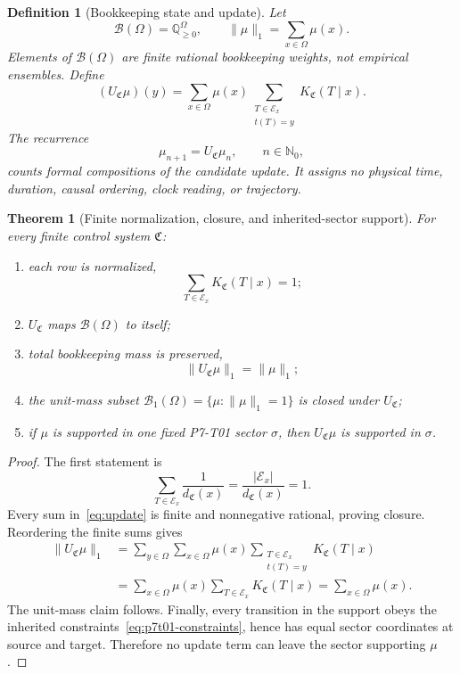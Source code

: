\documentclass[11pt]{article}
\newtheorem{definition}{Definition}
\newtheorem{theorem}{Theorem}
\newcommand{\Control}{\mathfrak C}
\newcommand{\Enabled}{\mathcal E}
\newcommand{\Book}{\mathcal B}
\newcommand{\Kernel}{K_{\Control}}
\newcommand{\Update}{U_{\Control}}
\begin{document}
\begin{definition}[Bookkeeping state and update]
Let
\[
  \Book(\Omega)=\mathbb Q_{\geq0}^{\Omega},
  \qquad
  \|\mu\|_1=\sum_{x\in\Omega}\mu(x).
\]
Elements of \(\Book(\Omega)\) are finite rational bookkeeping weights, not
empirical ensembles. Define
\begin{equation}
  (\Update\mu)(y)
  =
  \sum_{x\in\Omega}\mu(x)
  \sum_{\substack{T\in\Enabled_x\\t(T)=y}}
  \Kernel(T\mid x).
  \label{eq:update}
\end{equation}
The recurrence
\[
  \mu_{n+1}=\Update\mu_n,\qquad n\in\mathbb N_0,
\]
counts formal compositions of the candidate update. It assigns no physical
time, duration, causal ordering, clock reading, or trajectory.
\end{definition}

\begin{theorem}[Finite normalization, closure, and inherited-sector support]
\label{thm:normalization}
For every finite control system \(\Control\):
\begin{enumerate}[leftmargin=*]
\item each row is normalized,
  \[
    \sum_{T\in\Enabled_x}\Kernel(T\mid x)=1;
  \]
\item \(\Update\) maps \(\Book(\Omega)\) to itself;
\item total bookkeeping mass is preserved,
  \[
    \|\Update\mu\|_1=\|\mu\|_1;
  \]
\item the unit-mass subset
  \(\Book_1(\Omega)=\{\mu:\|\mu\|_1=1\}\) is closed under
  \(\Update\);
\item if \(\mu\) is supported in one fixed P7-T01 sector \(\sigma\), then
  \(\Update\mu\) is supported in \(\sigma\).
\end{enumerate}
\end{theorem}

\begin{proof}
The first statement is
\[
  \sum_{T\in\Enabled_x}\frac{1}{d_{\Control}(x)}
  =
  \frac{|\Enabled_x|}{d_{\Control}(x)}=1.
\]
Every sum in~\eqref{eq:update} is finite and nonnegative rational, proving
closure. Reordering the finite sums gives
\[
\begin{aligned}
  \|\Update\mu\|_1
  &=
  \sum_{y\in\Omega}\sum_{x\in\Omega}\mu(x)
  \sum_{\substack{T\in\Enabled_x\\t(T)=y}}
  \Kernel(T\mid x)\\
  &=
  \sum_{x\in\Omega}\mu(x)
  \sum_{T\in\Enabled_x}\Kernel(T\mid x)
  =
  \sum_{x\in\Omega}\mu(x).
\end{aligned}
\]
The unit-mass claim follows. Finally, every transition in the support obeys
the inherited constraints~\eqref{eq:p7t01-constraints}, hence has equal
sector coordinates at source and target. Therefore no update term can leave
the sector supporting \(\mu\).
\end{proof}
\end{document}
